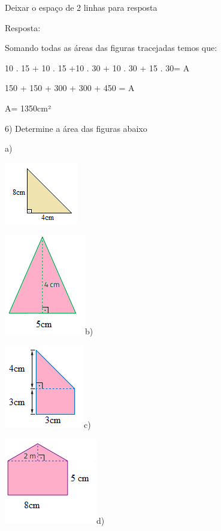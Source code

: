 Deixar o espaço de 2 linhas para resposta

Resposta:

Somando todas as áreas das figuras tracejadas temos que:

10 . 15 + 10 . 15 +10 . 30 + 10 . 30 + 15 . 30= A

150 + 150 + 300 + 300 + 450 = A

A= 1350cm²

6) Determine a área das figuras abaixo

a)

\includegraphics[width=1.26042in,height=1.0625in]{./imgSAEB_8_MAT/media/image46.png}

\includegraphics[width=1.39583in,height=1.72917in]{./imgSAEB_8_MAT/media/image47.png}b)

\includegraphics[width=1.375in,height=1.42708in]{./imgSAEB_8_MAT/media/image48.png}c)

\includegraphics[width=1.59375in,height=1.46875in]{./imgSAEB_8_MAT/media/image49.png}d)

